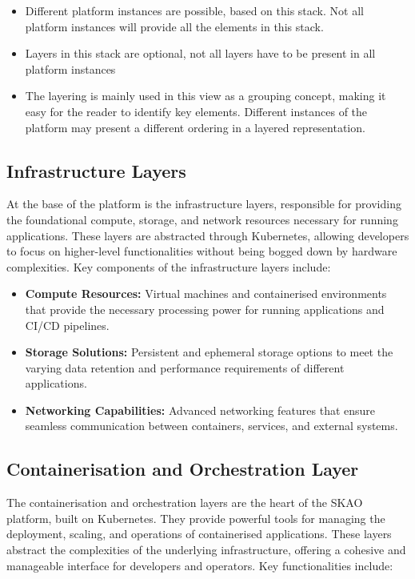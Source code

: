 \documentclass[a4paper]{spie}  %
\begin{document}
\begin{itemize}
    \item Different platform instances are possible, based on this stack. Not all platform instances will provide all the elements in this stack.
    \item Layers in this stack are optional, not all layers have to be present in all platform instances
    \item The layering is mainly used in this view as a grouping concept, making it easy for the reader to identify key elements. Different instances of the platform may present a different ordering in a layered representation.
\end{itemize}

\subsection{Infrastructure Layers}

At the base of the platform is the infrastructure layers, responsible for providing the foundational compute, storage, and network resources necessary for running applications. These layers are abstracted through Kubernetes, allowing developers to focus on higher-level functionalities without being bogged down by hardware complexities. Key components of the infrastructure layers include:

\begin{itemize}
    \item \textbf{Compute Resources:} Virtual machines and containerised environments that provide the necessary processing power for running applications and CI/CD pipelines.
    \item \textbf{Storage Solutions:} Persistent and ephemeral storage options to meet the varying data retention and performance requirements of different applications.
    \item \textbf{Networking Capabilities: }Advanced networking features that ensure seamless communication between containers, services, and external systems.
\end{itemize}

\subsection{Containerisation and Orchestration Layer}

The containerisation and orchestration layers are the heart of the SKAO platform, built on Kubernetes. They provide powerful tools for managing the deployment, scaling, and operations of containerised applications. These layers abstract the complexities of the underlying infrastructure, offering a cohesive and manageable interface for developers and operators. Key functionalities include:
\end{document}

